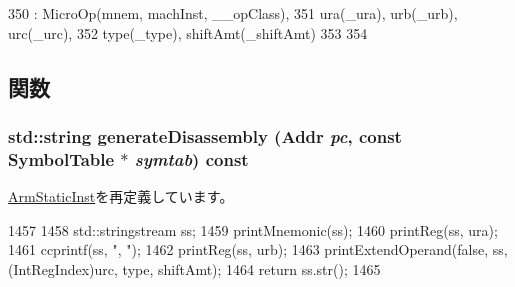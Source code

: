 \begin{DoxyCode}
350             : MicroOp(mnem, machInst, __opClass),
351               ura(_ura), urb(_urb), urc(_urc),
352               type(_type), shiftAmt(_shiftAmt)
353     {
354     }
\end{DoxyCode}


\subsection{関数}
\hypertarget{classArmISA_1_1MicroIntRegXOp_a95d323a22a5f07e14d6b4c9385a91896}{
\subsubsection[{generateDisassembly}]{\setlength{\rightskip}{0pt plus 5cm}std::string generateDisassembly ({\bf Addr} {\em pc}, \/  const SymbolTable $\ast$ {\em symtab}) const}}
\label{classArmISA_1_1MicroIntRegXOp_a95d323a22a5f07e14d6b4c9385a91896}


\hyperlink{classArmISA_1_1ArmStaticInst_a95d323a22a5f07e14d6b4c9385a91896}{ArmStaticInst}を再定義しています。


\begin{DoxyCode}
1457 {
1458     std::stringstream ss;
1459     printMnemonic(ss);
1460     printReg(ss, ura);
1461     ccprintf(ss, ", ");
1462     printReg(ss, urb);
1463     printExtendOperand(false, ss, (IntRegIndex)urc, type, shiftAmt);
1464     return ss.str();
1465 }
\end{DoxyCode}


